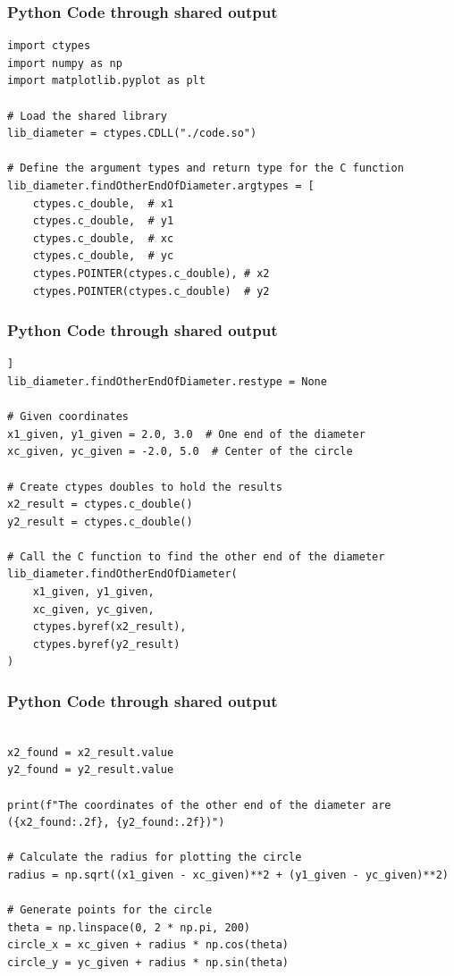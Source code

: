 \documentclass{beamer}
\begin{document}
\begin{frame}[fragile]
\frametitle{Python Code through shared output }

\begin{lstlisting}
import ctypes
import numpy as np
import matplotlib.pyplot as plt

# Load the shared library
lib_diameter = ctypes.CDLL("./code.so")

# Define the argument types and return type for the C function
lib_diameter.findOtherEndOfDiameter.argtypes = [
    ctypes.c_double,  # x1
    ctypes.c_double,  # y1
    ctypes.c_double,  # xc
    ctypes.c_double,  # yc
    ctypes.POINTER(ctypes.c_double), # x2
    ctypes.POINTER(ctypes.c_double)  # y2
    \end{lstlisting}
    \end{frame}
    \begin{frame}[fragile]
\frametitle{Python Code through shared output }

\begin{lstlisting}
]
lib_diameter.findOtherEndOfDiameter.restype = None

# Given coordinates
x1_given, y1_given = 2.0, 3.0  # One end of the diameter
xc_given, yc_given = -2.0, 5.0  # Center of the circle

# Create ctypes doubles to hold the results
x2_result = ctypes.c_double()
y2_result = ctypes.c_double()

# Call the C function to find the other end of the diameter
lib_diameter.findOtherEndOfDiameter(
    x1_given, y1_given,
    xc_given, yc_given,
    ctypes.byref(x2_result),
    ctypes.byref(y2_result)
)
\end{lstlisting}
\end{frame}
\begin{frame}[fragile]
\frametitle{Python Code through shared output  }

\begin{lstlisting}

x2_found = x2_result.value
y2_found = y2_result.value

print(f"The coordinates of the other end of the diameter are ({x2_found:.2f}, {y2_found:.2f})")

# Calculate the radius for plotting the circle
radius = np.sqrt((x1_given - xc_given)**2 + (y1_given - yc_given)**2)

# Generate points for the circle
theta = np.linspace(0, 2 * np.pi, 200)
circle_x = xc_given + radius * np.cos(theta)
circle_y = yc_given + radius * np.sin(theta)

\end{lstlisting}
\end{frame}
\end{document}

